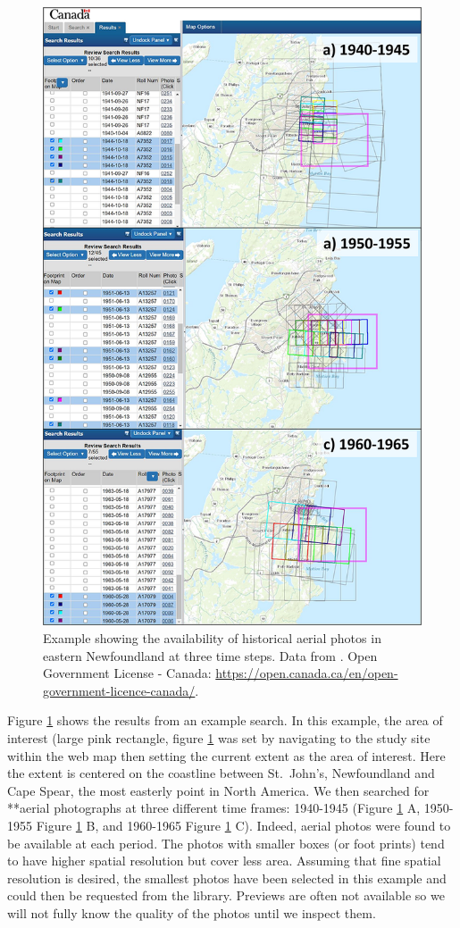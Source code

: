 \documentclass[
]{book}
\begin{document}
\begin{figure}
\includegraphics[width=0.75\linewidth]{images/04-accessing-aerial-photos} \caption{Example showing the availability of historical aerial photos in eastern Newfoundland at three time steps. Data from \citet{natural_resources_canada_earth_nodate}. Open Government License - Canada: \url{https://open.canada.ca/en/open-government-licence-canada/}.}\label{fig:4-accessing-aerial-photos}
\end{figure}

Figure \ref{fig:4-accessing-aerial-photos} shows the results from an example search. In this example, the area of interest (large pink rectangle, figure \ref{fig:4-accessing-aerial-photos} was set by navigating to the study site within the web map then setting the current extent as the area of interest. Here the extent is centered on the coastline between St.~John's, Newfoundland and Cape Spear, the most easterly point in North America. We then searched for **aerial photographs at three different time frames: 1940-1945 (Figure \ref{fig:4-accessing-aerial-photos} A, 1950-1955 Figure \ref{fig:4-accessing-aerial-photos} B, and 1960-1965 Figure \ref{fig:4-accessing-aerial-photos} C). Indeed, aerial photos were found to be available at each period. The photos with smaller boxes (or foot prints) tend to have higher spatial resolution but cover less area. Assuming that fine spatial resolution is desired, the smallest photos have been selected in this example and could then be requested from the library. Previews are often not available so we will not fully know the quality of the photos until we inspect them.
\end{document}
